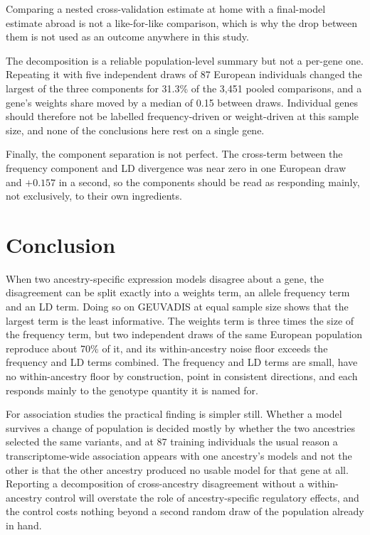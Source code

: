 \documentclass[conference]{IEEEtran}
\begin{document}
Comparing a nested cross-validation estimate at home with a final-model estimate abroad is not a like-for-like comparison, which is why the drop between them is not used as an outcome anywhere in this study.

The decomposition is a reliable population-level summary but not a per-gene one. Repeating it with five independent draws of 87 European individuals changed the largest of the three components for 31.3\% of the 3,451 pooled comparisons, and a gene's weights share moved by a median of 0.15 between draws. Individual genes should therefore not be labelled frequency-driven or weight-driven at this sample size, and none of the conclusions here rest on a single gene.

Finally, the component separation is not perfect. The cross-term between the frequency component and LD divergence was near zero in one European draw and $+0.157$ in a second, so the components should be read as responding mainly, not exclusively, to their own ingredients.

\section{Conclusion}
When two ancestry-specific expression models disagree about a gene, the disagreement can be split exactly into a weights term, an allele frequency term and an LD term. Doing so on GEUVADIS at equal sample size shows that the largest term is the least informative. The weights term is three times the size of the frequency term, but two independent draws of the same European population reproduce about 70\% of it, and its within-ancestry noise floor exceeds the frequency and LD terms combined. The frequency and LD terms are small, have no within-ancestry floor by construction, point in consistent directions, and each responds mainly to the genotype quantity it is named for.

For association studies the practical finding is simpler still. Whether a model survives a change of population is decided mostly by whether the two ancestries selected the same variants, and at 87 training individuals the usual reason a transcriptome-wide association appears with one ancestry's models and not the other is that the other ancestry produced no usable model for that gene at all. Reporting a decomposition of cross-ancestry disagreement without a within-ancestry control will overstate the role of ancestry-specific regulatory effects, and the control costs nothing beyond a second random draw of the population already in hand.
\end{document}
